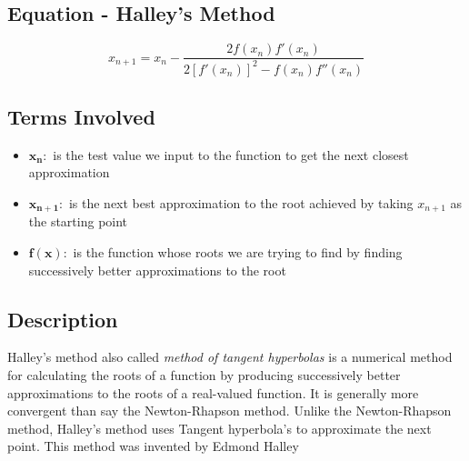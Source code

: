 
\subsection{Equation - Halley's Method}
\vspace{0.5cm}
\begin{equation}
	\boxed{x_{n+1} = x_{n} - \frac{2f(x_{n})f'(x_{n})}  {2[f'(x_{n})]^2 - f(x_{n})f''(x_{n}) } }
	\label{eq: halley}
\end{equation}
\vspace{0.5cm}

\subsection{Terms Involved}
	\begin{itemize}
        	\item $\mathbf{x_{n}:}$ \indent is the test value we input to the function to get the  next closest approximation
        	\item $\mathbf{x_{n+1}:}$ \indent is the next best approximation to the root achieved by taking $ x_{n+1} $ as the starting point
        	\item $\mathbf{f(x):}$ \indent is the function whose roots we are trying to find by finding successively better approximations to the root
	\end{itemize}

\subsection{Description}
	\indent Halley's method also called \textit{method of tangent hyperbolas} is a numerical method for calculating the roots of a function by producing successively better approximations to the roots of 
		a real-valued function. It is generally more convergent than say the Newton-Rhapson method. Unlike the Newton-Rhapson method, Halley's method uses Tangent hyperbola's to approximate the next 
		point. This method was invented by Edmond Halley



